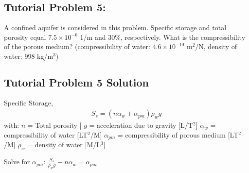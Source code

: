 \documentclass[letterpaper,10pt,english]{sphinxmanual}
\begin{document}
\subsection{Tutorial Problem 5:}
\label{\detokenize{contents/tutorials/tutorial_02/tutorial_02:tutorial-problem-5}}
A confined aquifer is considered in this problem. Specific storage and total porosity equal \(7.5\times 10^{-6}\) 1/m and 30\%, respectively.
What is the compressibility of the porous medium? (compressibility of water: \(4.6\times 10^{-10}\) m\(^2\)/N, density of water: 998 kg/m\(^3\))


\subsection{Tutorial Problem 5 \textendash{} Solution}
\label{\detokenize{contents/tutorials/tutorial_02/tutorial_02:tutorial-problem-5-solution}}

Specific Storage,
\begin{equation*}
\begin{split}S_s = (n\alpha_w + \alpha_{pm})\rho_w g\end{split}
\end{equation*}
with: \(n\) = Total porosity {[}\sphinxhyphen{}{]}
\(g\) = acceleration due to gravity {[}L/T\(^2\){]} 
\(\alpha_w\) = compressibility of water {[}LT\(^2\)/M{]}   
\(\alpha_{pm}\) =	compressibility of porous 	medium {[}LT\(^2\)/M{]}
\(\rho_w\) = density of water {[}M/L\(^3\){]}

Solve for \(\alpha_{pm}\): \(\frac{S_s}{\rho_w g} -n\alpha_w = \alpha_{pm}\)

\begin{sphinxVerbatim}[commandchars=\\\{\}]
 
   
   
   
   
   

    

 
\end{sphinxVerbatim}
\end{document}
